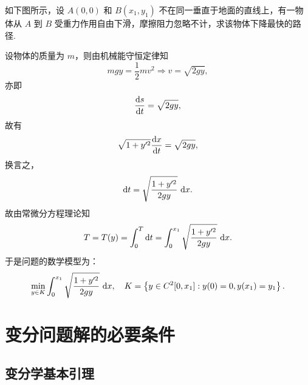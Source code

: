 \begin{example}
如下图所示，设 $A(0,0)$ 和 $B(x_1, y_1)$ 不在同一垂直于地面的直线上，有一物体从 $A$ 到 $B$ 受重力作用自由下滑，摩擦阻力忽略不计，求该物体下降最快的路径.

\begin{figure}[H]
    \centering
\end{figure}

设物体的质量为 $m$，则由机械能守恒定律知
\begin{equation*}
    mgy = \frac{1}{2}mv^2 \Rightarrow v = \sqrt{2gy},
\end{equation*}
亦即
\begin{equation*}
    \frac{\mathop{}\!\mathrm{d} s}{\mathop{}\!\mathrm{d} t} = \sqrt{2gy},
\end{equation*}
故有
\begin{equation*}
    \sqrt{1+y'^2}\frac{\mathop{}\!\mathrm{d} x}{\mathop{}\!\mathrm{d} t} = \sqrt{2gy},
\end{equation*}
换言之，
\begin{equation*}
    \mathop{}\!\mathrm{d} t = \sqrt{\frac{1+y'^2}{2gy}}\,\mathop{}\!\mathrm{d} x.
\end{equation*}
故由常微分方程理论知
\begin{equation*}
    T = T(y) = \int_0^T \mathop{}\!\mathrm{d} t = \int_0^{x_1} \sqrt{\frac{1+y'^2}{2gy}}\,\mathop{}\!\mathrm{d} x.
\end{equation*}
于是问题的数学模型为：
\begin{equation}\label{eq:最速降线问题}
    \min_{y\in K} \int_0^{x_1} \sqrt{\frac{1+y'^2}{2gy}}\,\mathop{}\!\mathrm{d} x, \quad K = \left\{y\in C^2[0,x_1]: y(0)=0, y(x_1)=y_1\right\}.
\end{equation}
\end{example}


\section{变分问题解的必要条件}

\subsection{变分学基本引理}

